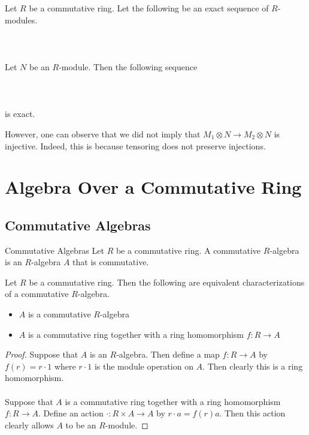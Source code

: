\documentclass[a4paper]{article}
\begin{document}
\begin{prp}{}{} Let $R$ be a commutative ring. Let the following be an exact sequence of $R$-modules. \\~\\
\\~\\ Let $N$ be an $R$-module. Then the following sequence \\~\\
 \\~\\
is exact. 
\end{prp}

However, one can observe that we did not imply that $M_1\otimes N\to M_2\otimes N$ is injective. Indeed, this is because tensoring does not preserve injections. 

\pagebreak
\section{Algebra Over a Commutative Ring}
\subsection{Commutative Algebras}
\begin{defn}{Commutative Algebras}{} Let $R$ be a commutative ring. A commutative $R$-algebra is an $R$-algebra $A$ that is commutative. 
\end{defn}

\begin{prp}{}{} Let $R$ be a commutative ring. Then the following are equivalent characterizations of a commutative $R$-algebra. 
\begin{itemize}
\item $A$ is a commutative $R$-algebra
\item $A$ is a commutative ring together with a ring homomorphism $f:R\to A$
\end{itemize}\tcbline
\begin{proof}
Suppose that $A$ is an $R$-algebra. Then define a map $f:R\to A$ by $f(r)=r\cdot 1$ where $r\cdot 1$ is the module operation on $A$. Then clearly this is a ring homomorphism. \\~\\
Suppose that $A$ is a commutative ring together with a ring homomorphism $f:R\to A$. Define an action $\cdot:R\times A\to A$ by $r\cdot a=f(r)a$. Then this action clearly allows $A$ to be an $R$-module. 
\end{proof}
\end{prp}
\end{document}
